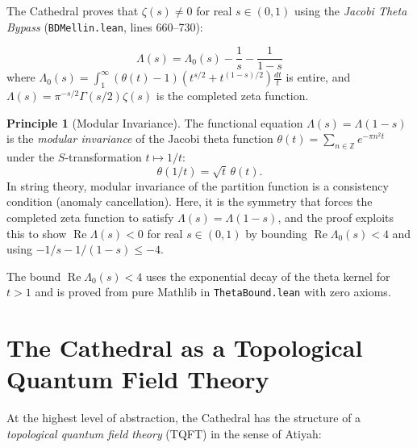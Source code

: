 \documentclass[11pt,a4paper]{article}
\theoremstyle{definition}
\newtheorem{principle}[definition]{Principle}
\newcommand{\re}{\operatorname{Re}}
\newcommand{\ZZ}{\mathbb{Z}}
\newcommand{\lean}[1]{\texttt{#1}}
\begin{document}
The Cathedral proves that $\zeta(s) \neq 0$ for real $s \in (0,1)$
using the \emph{Jacobi Theta Bypass} (\lean{BDMellin.lean}, lines 660--730):

\[
  \Lambda(s) = \Lambda_0(s) - \frac{1}{s} - \frac{1}{1-s}
\]
where $\Lambda_0(s) = \int_1^\infty (\theta(t) - 1)(t^{s/2} + t^{(1-s)/2})\frac{dt}{t}$
is entire, and $\Lambda(s) = \pi^{-s/2}\Gamma(s/2)\zeta(s)$ is the
completed zeta function.

\begin{principle}[Modular Invariance]
The functional equation $\Lambda(s) = \Lambda(1-s)$ is the
\emph{modular invariance} of the Jacobi theta function
$\theta(t) = \sum_{n \in \ZZ} e^{-\pi n^2 t}$ under the
$S$-transformation $t \mapsto 1/t$:
\[
  \theta(1/t) = \sqrt{t}\,\theta(t).
\]
In string theory, modular invariance of the partition function is a
consistency condition (anomaly cancellation). Here, it is the
symmetry that forces the completed zeta function to satisfy
$\Lambda(s) = \Lambda(1-s)$, and the proof exploits this to show
$\re\Lambda(s) < 0$ for real $s \in (0,1)$ by bounding
$\re\Lambda_0(s) < 4$ and using $-1/s - 1/(1-s) \leq -4$.
\end{principle}

The bound $\re\Lambda_0(s) < 4$ uses the exponential decay of the
theta kernel for $t > 1$ and is proved from pure Mathlib in
\lean{ThetaBound.lean} with zero axioms.

\section{The Cathedral as a Topological Quantum Field Theory}
\label{sec:tqft}

At the highest level of abstraction, the Cathedral has the structure
of a \emph{topological quantum field theory} (TQFT) in the sense
of Atiyah:
\end{document}
